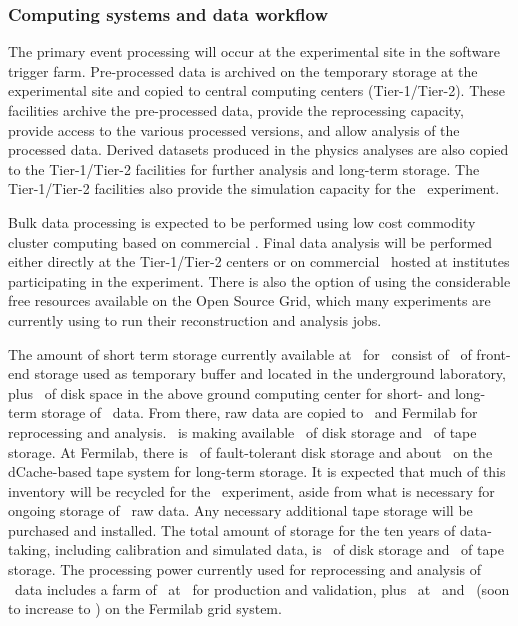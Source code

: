 \subsubsection{Computing systems and data workflow}
The primary event processing will occur at the experimental site in the software trigger farm. Pre-processed data is archived on the temporary storage at the experimental site and copied to central computing centers (Tier-1/Tier-2). These facilities archive the pre-processed data, provide the reprocessing capacity, provide access to the various processed versions, and allow analysis of the processed data. Derived datasets produced in the physics analyses are also copied to the Tier-1/Tier-2 facilities for further analysis and long-term storage. The Tier-1/Tier-2 facilities also provide the simulation capacity for the \DSks\ experiment. 

Bulk data processing is expected to be performed using low cost commodity cluster computing based on commercial \CPUs.  Final data analysis will be performed either directly at the Tier-1/Tier-2 centers or on commercial \CPUs\ hosted at institutes participating in the experiment.  There is also the option of using the considerable free resources available on the Open Source Grid, which many experiments are currently using to run their reconstruction and analysis jobs.

The amount of short term storage currently available at \LNGS\ for \DSfs\ consist of \DSfDataStorageLNGSShortDisk\ of front-end storage used as temporary buffer and located in the underground laboratory, plus \DSfDataStorageLNGSLongDisk\ of disk space in the above ground computing center for short- and long-term storage of \DSfs\ data.  From there, raw data are copied to \CNAF\ and Fermilab for reprocessing and analysis.  \CNAF\ is making available \DSfDataStorageCNAFDisk\ of disk storage and \DSfDataStorageCNAFTape\ of tape storage.  At Fermilab, there is \DSfDataStorageFNALDisk\ of fault-tolerant disk storage and about \DSfDataStorageFNALTape\ on the dCache-based tape system for long-term storage.  It is expected that much of this inventory will be recycled for the \DSks\ experiment, aside from what is necessary for ongoing storage of \DSfs\ raw data.  Any necessary additional tape storage will be purchased and installed. The total amount of storage for the ten years of data-taking, including calibration and simulated data, is \DSkDataStorageTotalDiskNewProposalExtended\ of disk storage and \DSkDataStorageTotalDiskNewProposalExtended\ of tape storage. The processing power currently used for reprocessing and analysis of \DSf\ data includes a farm of \DSfCPUsLNGS\ at \LNGS\ for production and validation, plus \DSfCPUsCNAF\ at \CNAF\ and \DSfCPUsFNAL\ (soon to increase to \DSfCPUsFNALUpgrade) on the Fermilab grid system.  


